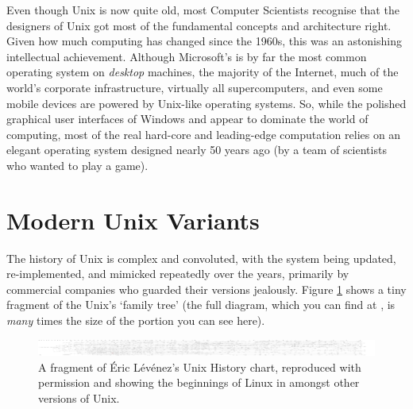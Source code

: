 Even though Unix is now quite old, most Computer Scientists recognise that the designers of Unix got most of the fundamental concepts and
architecture right. Given how much computing has changed since the 1960s, this was an astonishing intellectual achievement. Although Microsoft's  is by far the most common operating system on \emph{desktop} machines, the majority of the Internet, much of the world's corporate infrastructure, virtually all supercomputers, and even some mobile devices are powered by Unix-like operating systems. So, while the polished graphical user interfaces of Windows and  appear to dominate the world of computing, most of the real hard-core and leading-edge computation relies on an elegant operating system designed nearly 50 years ago (by a team of scientists who wanted to play a game).  

\section{Modern Unix Variants}
\label{sec:modern-unix-variants}


The history of Unix is complex and convoluted, with the system being updated, re-implemented, and mimicked repeatedly over the years, primarily by commercial companies who guarded their versions jealously. Figure \ref{fig:unix-history} shows a tiny fragment of the Unix's `family tree' (the full diagram, which you can find at , is \emph{many} times the size of the portion you can see here).

\begin{figure}[h!tb]
  \begin{center}
    \includegraphics[width=13cm]{images/unix}
  \end{center}
\caption{A fragment of \'{E}ric L\'{e}v\'{e}nez's Unix History chart, reproduced with permission and showing the beginnings of Linux in amongst other versions of Unix.}
\label{fig:unix-history}
\end{figure}
 
